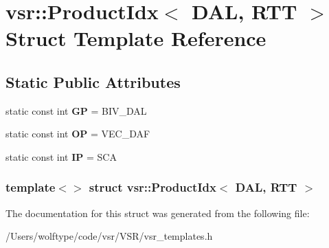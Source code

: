 \hypertarget{structvsr_1_1_product_idx_3_01_d_a_l_00_01_r_t_t_01_4}{\section{vsr\-:\-:Product\-Idx$<$ D\-A\-L, R\-T\-T $>$ Struct Template Reference}
\label{structvsr_1_1_product_idx_3_01_d_a_l_00_01_r_t_t_01_4}
}
\subsection*{Static Public Attributes}
\begin{DoxyCompactItemize}
\item 
\hypertarget{structvsr_1_1_product_idx_3_01_d_a_l_00_01_r_t_t_01_4_aa3051f982bf80b8539626c00501169a9}{static const int {\bfseries G\-P} = B\-I\-V\-\_\-\-D\-A\-L}\label{structvsr_1_1_product_idx_3_01_d_a_l_00_01_r_t_t_01_4_aa3051f982bf80b8539626c00501169a9}

\item 
\hypertarget{structvsr_1_1_product_idx_3_01_d_a_l_00_01_r_t_t_01_4_ab73e885c0b032cced7f16a4a9aee9540}{static const int {\bfseries O\-P} = V\-E\-C\-\_\-\-D\-A\-F}\label{structvsr_1_1_product_idx_3_01_d_a_l_00_01_r_t_t_01_4_ab73e885c0b032cced7f16a4a9aee9540}

\item 
\hypertarget{structvsr_1_1_product_idx_3_01_d_a_l_00_01_r_t_t_01_4_abfb91a5a5bced217abfd8ecc87e1754c}{static const int {\bfseries I\-P} = S\-C\-A}\label{structvsr_1_1_product_idx_3_01_d_a_l_00_01_r_t_t_01_4_abfb91a5a5bced217abfd8ecc87e1754c}

\end{DoxyCompactItemize}
\subsubsection*{template$<$$>$ struct vsr\-::\-Product\-Idx$<$ D\-A\-L, R\-T\-T $>$}



The documentation for this struct was generated from the following file\-:\begin{DoxyCompactItemize}
\item 
/\-Users/wolftype/code/vsr/\-V\-S\-R/vsr\-\_\-templates.\-h\end{DoxyCompactItemize}
